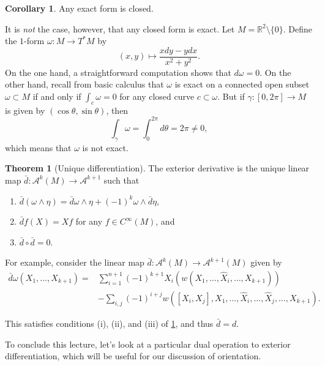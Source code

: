 \documentclass[10pt,letterpaper,cm]{nupset}
\theoremstyle{definition}
\theoremstyle{theorem}
\newtheorem{theorem}[definition]{Theorem}
\newtheorem{corollary}[definition]{Corollary}
\theoremstyle{remark}
\newcommand{\R}{\mathbb R}
\newcommand{\1}{\mathbf{1}}
\newcommand{\0}{\vec 0}
\begin{document}
\begin{corollary}
Any exact form is closed.
\end{corollary}

\smallskip


It is \emph{not} the case, however, that any closed form is exact. Let $M=  \R^2 \setminus \{0\}$. Define the $1$-form $\omega : M \to T^{\ast}M$ by $$\left(x, y\right) \mapsto \frac{xdy - y dx}{x^2 + y^2}.$$ On the one hand, a straightforward computation shows that $d \omega =0$. On the other hand, recall from basic calculus that $\omega$ is exact on a connected open subset $\omega \subset M$ if and only if $\int_c \omega =0$ for any closed curve $c \subset \omega$. But if $\gamma : [0, 2\pi] \to M$ is given by $\left(\cos \theta, \sin \theta\right)$, then  
\[\label{eqn:nexact}
 \int_{\gamma} \omega = \int_{0}^{2\pi} d\theta = 2\pi \ne 0 , \tag{$\dagger$}
\] which means that $\omega$ is not exact.


\begin{theorem}[Unique differentiation]\label{UD}
The exterior derivative is the unique linear map $\bar{d} : \mathcal{A}^k(M) \to \mathcal{A}^{k+1}$ such that
\begin{enumerate}[label=(\roman*)]
\item $\bar{d}( \omega \wedge \eta) = \bar{d} \omega \wedge \eta + \left({-1}\right)^k\omega \wedge \bar{d} \eta$,
\item $\bar{d}{f}(X)= X{f}$ for any $f\in C^{\infty}(M)$, and 
\item $\bar{d} \circ \bar{d} = 0$.
\end{enumerate}
\end{theorem}

\medskip

For example, consider the linear map $\bar{d} : \mathcal{A}^k(M) \to \mathcal{A}^{k+1}(M)$ given by  
\begin{align*} 
\bar{d}{\omega}\left(X_1, \ldots, X_{k+1}\right)  = 
&\sum_{i=1}^{n+1}(-1)^{k+1} X_{i}\left(w\left(X_{1}, \ldots, \widehat{X}_{i}, \ldots, X_{k+1}\right)\right)\\
&-\sum_{i, j}(-1)^{i+j} w\left(\left[X_{i}, X_{j}\right], X_{1}, \ldots, \widehat{X}_{i}, \ldots, \widehat{X}_{j}, \ldots, X_{k+1}\right).
\end{align*}

This satisfies conditions (i), (ii), and (iii) of \cref{UD}, and thus $\bar{d} = d$.


\bigskip

To conclude this lecture, let's look at a particular dual operation to exterior differentiation, which will be useful for our discussion of orientation. 
\end{document}
